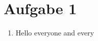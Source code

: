 \section*{Aufgabe 1}

\begin{enumerate}[label=\alph*)]

\item Hello everyone and every

\end{enumerate}

